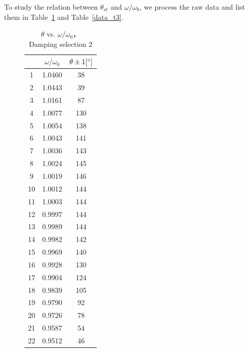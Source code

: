 To study the relation between $\theta_{st}$ and $\omega/\omega_0$, we process the raw data and list them in Table~\ref{data_t2} and Table~\ref{data_t3}.






\begin{figure}
  \centering
\begin{minipage}{0.45\textwidth}
\begin{table}[H]
\centering
\begin{tabular}{|c|c|c|}
\hline
& $\omega/\omega_0$ &  $\theta \pm 1 [^\circ] $ \\ \hline
1  & 1.0460  & 38   \\ \hline
2  & 1.0443  & 39   \\ \hline
3  & 1.0161  & 87   \\ \hline
4  & 1.0077  & 130  \\ \hline
5  & 1.0054  & 138  \\ \hline
6  & 1.0043  & 141  \\ \hline
7  & 1.0036  & 143  \\ \hline
8  & 1.0024  & 145  \\ \hline
9  & 1.0019  & 146  \\ \hline
10 & 1.0012  & 144  \\ \hline
11 & 1.0003  & 144  \\ \hline
12 & 0.9997  & 144  \\ \hline
13 & 0.9989  & 144  \\ \hline
14 & 0.9982  & 142  \\ \hline
15 & 0.9969  & 140  \\ \hline
16 & 0.9928  & 130  \\ \hline
17 & 0.9904  & 124  \\ \hline
18 & 0.9839  & 105  \\ \hline
19 & 0.9790  & 92   \\ \hline
20 & 0.9726  & 78   \\ \hline
21 & 0.9587  & 54   \\ \hline
22 & 0.9512  & 46   \\ \hline
\end{tabular}    
\caption{$\theta$ vs. $\omega/\omega_0$，\\ Damping selection 2}\label{data_t2}
\end{table}
\end{minipage}
%
\begin{minipage}{0.45\textwidth}
\begin{table}[H]

\end{table}
\end{minipage}
\end{figure}
